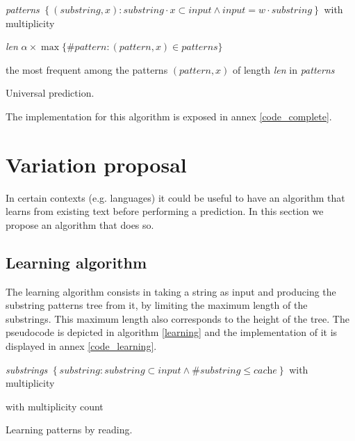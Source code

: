 \documentclass[a4paper,12pt]{article}
\begin{document}
    \begin{algorithm}

      \textit{patterns} \gets{}
        $\left\{ (\textit{substring},x) :%
        \textit{substring}\cdot x\subset\textit{input} \wedge
        \textit{input} = w\cdot\textit{substring} \right\}$
        with multiplicity\;

      \textit{len} \gets{} $\alpha\times\max\{\#\textit{pattern} :
        (\textit{pattern},x)\in\textit{patterns}\}$\;

       the most frequent among the patterns $(\textit{pattern},x)$
        of length \textit{len} in \textit{patterns}\;

      \caption{\label{complete}Universal prediction.}
    \end{algorithm}

    The implementation for this algorithm is exposed in annex \ref{code_complete}.

    \section{Variation proposal}\label{variation_algo}

    In certain contexts (e.g. languages) it could be useful to have an algorithm that learns from existing text  before performing a prediction. In this section we propose an algorithm that does so.
  
  \subsection{Learning algorithm}

  The learning algorithm consists in taking a string as input and producing the substring patterns tree from it, by limiting the maximum length of the substrings. This maximum length also corresponds to the height of the tree. The pseudocode is depicted in algorithm \ref{learning} and the implementation of it is displayed in annex \ref{code_learning}.

  \begin{algorithm}

    \textit{substrings} \gets{}
      $\left\{ \textit{substring} : \textit{substring}\subset\textit{input}
      \wedge \#\textit{substring} \leq \textit{cache} \right\}$
      with multiplicity\;

     with multiplicity count\;

    \caption{\label{learning}Learning patterns by reading.}
  \end{algorithm}
\end{document}
